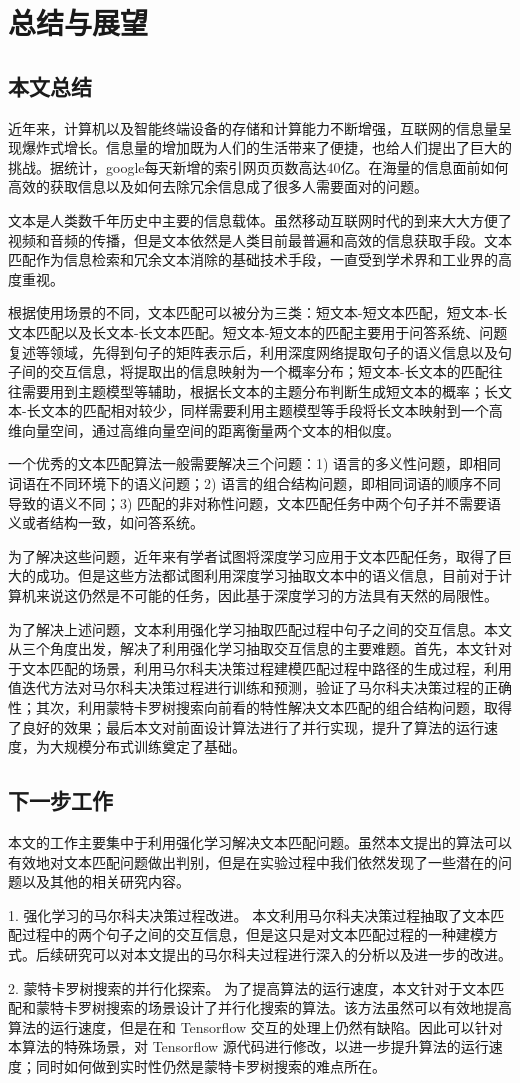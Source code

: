 \chapter{总结与展望}
\section{本文总结}
近年来，计算机以及智能终端设备的存储和计算能力不断增强，互联网的信息量呈现爆炸式增长。信息量的增加既为人们的生活带来了便捷，也给人们提出了巨大的挑战。据统计，google每天新增的索引网页页数高达40亿。在海量的信息面前如何高效的获取信息以及如何去除冗余信息成了很多人需要面对的问题。

文本是人类数千年历史中主要的信息载体。虽然移动互联网时代的到来大大方便了视频和音频的传播，但是文本依然是人类目前最普遍和高效的信息获取手段。文本匹配作为信息检索和冗余文本消除的基础技术手段，一直受到学术界和工业界的高度重视。

根据使用场景的不同，文本匹配可以被分为三类：短文本-短文本匹配，短文本-长文本匹配以及长文本-长文本匹配。短文本-短文本的匹配主要用于问答系统、问题复述等领域，先得到句子的矩阵表示后，利用深度网络提取句子的语义信息以及句子间的交互信息，将提取出的信息映射为一个概率分布；短文本-长文本的匹配往往需要用到主题模型等辅助，根据长文本的主题分布判断生成短文本的概率；长文本-长文本的匹配相对较少，同样需要利用主题模型等手段将长文本映射到一个高维向量空间，通过高维向量空间的距离衡量两个文本的相似度。

一个优秀的文本匹配算法一般需要解决三个问题：1) 语言的多义性问题，即相同词语在不同环境下的语义问题；2) 语言的组合结构问题，即相同词语的顺序不同导致的语义不同；3) 匹配的非对称性问题，文本匹配任务中两个句子并不需要语义或者结构一致，如问答系统。

为了解决这些问题，近年来有学者试图将深度学习应用于文本匹配任务，取得了巨大的成功。但是这些方法都试图利用深度学习抽取文本中的语义信息，目前对于计算机来说这仍然是不可能的任务，因此基于深度学习的方法具有天然的局限性。

为了解决上述问题，文本利用强化学习抽取匹配过程中句子之间的交互信息。本文从三个角度出发，解决了利用强化学习抽取交互信息的主要难题。首先，本文针对于文本匹配的场景，利用马尔科夫决策过程建模匹配过程中路径的生成过程，利用值迭代方法对马尔科夫决策过程进行训练和预测，验证了马尔科夫决策过程的正确性；其次，利用蒙特卡罗树搜索向前看的特性解决文本匹配的组合结构问题，取得了良好的效果；最后本文对前面设计算法进行了并行实现，提升了算法的运行速度，为大规模分布式训练奠定了基础。
\section{下一步工作}
本文的工作主要集中于利用强化学习解决文本匹配问题。虽然本文提出的算法可以有效地对文本匹配问题做出判别，但是在实验过程中我们依然发现了一些潜在的问题以及其他的相关研究内容。

1. 强化学习的马尔科夫决策过程改进。
本文利用马尔科夫决策过程抽取了文本匹配过程中的两个句子之间的交互信息，但是这只是对文本匹配过程的一种建模方式。后续研究可以对本文提出的马尔科夫过程进行深入的分析以及进一步的改进。

2. 蒙特卡罗树搜索的并行化探索。
为了提高算法的运行速度，本文针对于文本匹配和蒙特卡罗树搜索的场景设计了并行化搜索的算法。该方法虽然可以有效地提高算法的运行速度，但是在和 Tensorflow 交互的处理上仍然有缺陷。因此可以针对本算法的特殊场景，对 Tensorflow 源代码进行修改，以进一步提升算法的运行速度；同时如何做到实时性仍然是蒙特卡罗树搜索的难点所在。
